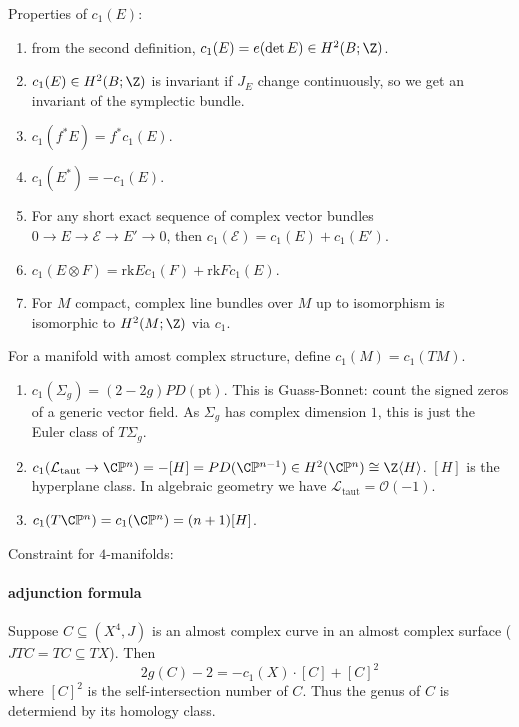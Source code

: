 \documentclass[a4paper]{article}
\renewcommand*{\P}{\mathbb{P}}
\begin{document}
Properties of \(c_1(E)\):
\begin{enumerate}
\item from the second definition, \(c_1(E) = e(\det E) \in H^2(B; \Z)\).
\item \(c_1(E) \in H^2(B; \Z)\) is invariant if \(J_E\) change continuously, so we get an invariant of the symplectic bundle.
\item \(c_1(f^*E) = f^*c_1(E)\).
\item \(c_1(E^*) = -c_1(E)\).
\item For any short exact sequence of complex vector bundles \(0 \to E \to \mathcal E \to E' \to 0\), then \(c_1(\mathcal E) = c_1(E) + c_1(E')\).
\item \(c_1(E \otimes F) = \mathrm{rk} E c_1(F) + \mathrm{rk} F c_1(E)\).
\item For \(M\) compact, complex line bundles over \(M\) up to isomorphism is isomorphic to \(H^2(M; \Z)\) via \(c_1\).
\end{enumerate}

\begin{notation}
  For a manifold with amost complex structure, define \(c_1(M) = c_1(TM)\).
\end{notation}

\begin{ex}\leavevmode
  \begin{enumerate}
  \item \(c_1(\Sigma_g) = (2 - 2g) PD(\mathrm{pt})\). This is Guass-Bonnet: count the signed zeros of a generic vector field. As \(\Sigma_g\) has complex dimension \(1\), this is just the Euler class of \(T\Sigma_g\).
  \item \(c_1(\mathcal L_{\mathrm{taut}} \to \C\P^n) = -[H] = PD(\C\P^{n -1}) \in H^2(\C\P^n) \cong \Z \langle H\rangle\). \([H]\) is the hyperplane class. In algebraic geometry we have \(\mathcal L_{\mathrm{taut}} = \mathcal O(-1)\).
  \item \(c_1(T \C\P^n) = c_1(\C\P^n) = (n + 1) [H]\).
  \end{enumerate}
\end{ex}

Constraint for \(4\)-manifolds:

\paragraph{adjunction formula}

Suppose \(C \subseteq (X^4, J)\) is an almost complex curve in an almost complex surface (\(JTC = TC \subseteq TX\)). Then
\[
  2g(C) - 2 = -c_1(X) \cdot [C] + [C]^2
\]
where \([C]^2\) is the self-intersection number of \(C\). Thus the genus of \(C\) is determiend by its homology class.
\end{document}
